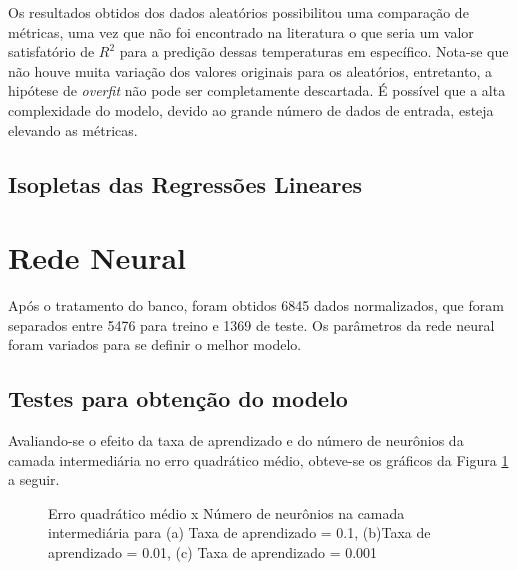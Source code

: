 \documentclass[brazil,tf,epusp]{usp}  %
\begin{document}
Os resultados obtidos dos dados aleatórios possibilitou uma comparação de métricas, uma vez que não foi encontrado na literatura o que seria um valor satisfatório de $R^{2}$ para a predição dessas temperaturas em específico. Nota-se que não houve muita variação dos valores originais para os aleatórios, entretanto, a hipótese de \textit{overfit} não pode ser completamente descartada. É possível que a alta complexidade do modelo, devido ao grande número de dados de entrada, esteja elevando as métricas.

\subsection{Isopletas das Regressões Lineares}

\section{Rede Neural}
Após o tratamento do banco, foram obtidos 6845 dados normalizados, que foram separados entre 5476 para treino e 1369 de teste. Os parâmetros da rede neural foram variados para se definir o melhor modelo.

\subsection{Testes para obtenção do modelo}

Avaliando-se o efeito da taxa de aprendizado e do número de neurônios da camada intermediária no erro quadrático médio, obteve-se os
gráficos da Figura \ref{fig:test_NN} a seguir.

\begin{figure}[!h]
\caption{Erro quadrático médio x Número de neurônios na camada intermediária para (a) Taxa de aprendizado = 0.1, (b)Taxa de aprendizado = 0.01, (c) Taxa de aprendizado = 0.001}
\label{fig:test_NN}
\end{figure}
\end{document}
